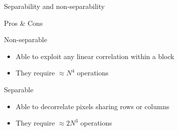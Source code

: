 \documentclass[10pt]{beamer} %
\begin{document}
\begin{frame}{Separability and non-separability}
	\begin{block}{Pros \& Cons}
		\begin{minipage}{0.48\textwidth}
			\begin{block}{Non-separable}
				\begin{itemize}
					\item Able to exploit any linear correlation within a
						block
					\item They require $\approx N^4$ operations
				\end{itemize}
			\end{block}
		\end{minipage}
		\hfill
		\begin{minipage}{0.48\textwidth}
			\begin{block}{Separable}
				\begin{itemize}
					\item Able to decorrelate pixels sharing
						rows or columns
					\item They require $\approx 2 N^3$ operations
				\end{itemize}
			\end{block}
		\end{minipage}
	\end{block}
\end{frame}
\end{document}
